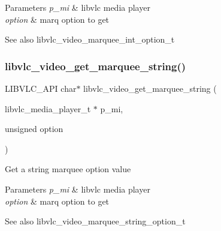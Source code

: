 \begin{DoxyParams}{Parameters}
{\em p\+\_\+mi} & libvlc media player \\
\hline
{\em option} & marq option to get \\
\hline
\end{DoxyParams}
\begin{DoxySeeAlso}{See also}
libvlc\+\_\+video\+\_\+marquee\+\_\+int\+\_\+option\+\_\+t 
\end{DoxySeeAlso}
\mbox{\label{group__libvlc__video_ga77bc2682e4cd9771a24948f913ea9379}} 
\subsubsection{\texorpdfstring{libvlc\+\_\+video\+\_\+get\+\_\+marquee\+\_\+string()}{libvlc\_video\_get\_marquee\_string()}}
{\footnotesize\ttfamily L\+I\+B\+V\+L\+C\+\_\+\+A\+PI char$\ast$ libvlc\+\_\+video\+\_\+get\+\_\+marquee\+\_\+string (\begin{DoxyParamCaption}\item[{libvlc\+\_\+media\+\_\+player\+\_\+t $\ast$}]{p\+\_\+mi,  }\item[{unsigned}]{option }\end{DoxyParamCaption})}

Get a string marquee option value


\begin{DoxyParams}{Parameters}
{\em p\+\_\+mi} & libvlc media player \\
\hline
{\em option} & marq option to get \\
\hline
\end{DoxyParams}
\begin{DoxySeeAlso}{See also}
libvlc\+\_\+video\+\_\+marquee\+\_\+string\+\_\+option\+\_\+t 
\end{DoxySeeAlso}
\mbox{\label{group__libvlc__video_gaae1c4a4dafeb09d7b9f2ab29fcedc0f8}} 
